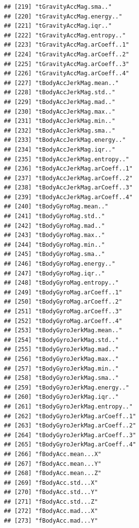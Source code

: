\documentclass[
]{article}
\begin{document}
\begin{verbatim}
## [219] "tGravityAccMag.sma.."                
## [220] "tGravityAccMag.energy.."             
## [221] "tGravityAccMag.iqr.."                
## [222] "tGravityAccMag.entropy.."            
## [223] "tGravityAccMag.arCoeff..1"           
## [224] "tGravityAccMag.arCoeff..2"           
## [225] "tGravityAccMag.arCoeff..3"           
## [226] "tGravityAccMag.arCoeff..4"           
## [227] "tBodyAccJerkMag.mean.."              
## [228] "tBodyAccJerkMag.std.."               
## [229] "tBodyAccJerkMag.mad.."               
## [230] "tBodyAccJerkMag.max.."               
## [231] "tBodyAccJerkMag.min.."               
## [232] "tBodyAccJerkMag.sma.."               
## [233] "tBodyAccJerkMag.energy.."            
## [234] "tBodyAccJerkMag.iqr.."               
## [235] "tBodyAccJerkMag.entropy.."           
## [236] "tBodyAccJerkMag.arCoeff..1"          
## [237] "tBodyAccJerkMag.arCoeff..2"          
## [238] "tBodyAccJerkMag.arCoeff..3"          
## [239] "tBodyAccJerkMag.arCoeff..4"          
## [240] "tBodyGyroMag.mean.."                 
## [241] "tBodyGyroMag.std.."                  
## [242] "tBodyGyroMag.mad.."                  
## [243] "tBodyGyroMag.max.."                  
## [244] "tBodyGyroMag.min.."                  
## [245] "tBodyGyroMag.sma.."                  
## [246] "tBodyGyroMag.energy.."               
## [247] "tBodyGyroMag.iqr.."                  
## [248] "tBodyGyroMag.entropy.."              
## [249] "tBodyGyroMag.arCoeff..1"             
## [250] "tBodyGyroMag.arCoeff..2"             
## [251] "tBodyGyroMag.arCoeff..3"             
## [252] "tBodyGyroMag.arCoeff..4"             
## [253] "tBodyGyroJerkMag.mean.."             
## [254] "tBodyGyroJerkMag.std.."              
## [255] "tBodyGyroJerkMag.mad.."              
## [256] "tBodyGyroJerkMag.max.."              
## [257] "tBodyGyroJerkMag.min.."              
## [258] "tBodyGyroJerkMag.sma.."              
## [259] "tBodyGyroJerkMag.energy.."           
## [260] "tBodyGyroJerkMag.iqr.."              
## [261] "tBodyGyroJerkMag.entropy.."          
## [262] "tBodyGyroJerkMag.arCoeff..1"         
## [263] "tBodyGyroJerkMag.arCoeff..2"         
## [264] "tBodyGyroJerkMag.arCoeff..3"         
## [265] "tBodyGyroJerkMag.arCoeff..4"         
## [266] "fBodyAcc.mean...X"                   
## [267] "fBodyAcc.mean...Y"                   
## [268] "fBodyAcc.mean...Z"                   
## [269] "fBodyAcc.std...X"                    
## [270] "fBodyAcc.std...Y"                    
## [271] "fBodyAcc.std...Z"                    
## [272] "fBodyAcc.mad...X"                    
## [273] "fBodyAcc.mad...Y"                    

\end{verbatim}
\end{document}
